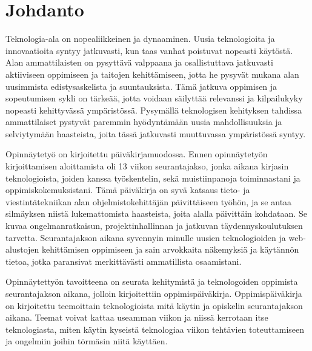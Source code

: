 \documentclass[11pt,a4paper,titlepage,oneside]{article}
\begin{document}
    






\section{Johdanto}              %




Teknologia-ala on nopealiikkeinen ja dynaaminen. 
Uusia teknologioita ja innovaatioita syntyy jatkuvasti, kun taas vanhat poistuvat nopeasti käytöstä.
Alan ammattilaisten on pysyttävä valppaana ja osallistuttava jatkuvasti aktiiviseen oppimiseen ja taitojen kehittämiseen,
jotta he pysyvät mukana alan uusimmista edistysaskelista ja suuntauksista.
Tämä jatkuva oppimisen ja sopeutumisen sykli on tärkeää,
jotta voidaan säilyttää relevanssi ja kilpailukyky nopeasti kehittyvässä ympäristössä.
%
Pysymällä teknologisen kehityksen tahdissa ammattilaiset pystyvät paremmin hyödyntämään uusia mahdollisuuksia ja selviytymään haasteista,
joita tässä jatkuvasti muuttuvassa ympäristössä syntyy.
\medskip




Opinnäytetyö on kirjoitettu päiväkirjamuodossa. 
Ennen opinnäytetyön kirjoittamisen aloittamista oli 13 viikon seurantajakso, jonka aikana kirjasin teknologioista,
joiden kanssa työskentelin, sekä muistiinpanoja toiminnastani ja oppimiskokemuksistani.
Tämä päiväkirja on syvä katsaus tieto- ja viestintätekniikan alan ohjelmistokehittäjän päivittäiseen työhön,
ja se antaa silmäyksen niistä lukemattomista haasteista, joita alalla päivittäin kohdataan.
Se kuvaa ongelmanratkaisun, projektinhallinnan ja jatkuvan täydennyskoulutuksen tarvetta.
Seurantajakson aikana syvennyin minulle uusien teknologioiden ja web-alustojen kehittämisen oppimiseen ja sain arvokkaita näkemyksiä ja käytännön tietoa,
jotka paransivat merkittävästi ammatillista osaamistani.
\medskip



% 
Opinnäytettyön tavoitteena on seurata kehitymistä ja teknologoiden oppimista seurantajakson aikana,
jolloin kirjoitettiin oppimispäiväkirja.
% 
Oppimispäiväkirja on kirjoitettu teemoittain teknologioista mitä käytin ja opiskelin seurantajakson aikana.
Teemat voivat kattaa useamman viikon ja niissä kerrotaan itse teknologiasta, miten käytin kyseistä teknologiaa viikon tehtävien toteuttamiseen ja
ongelmiin joihin törmäsin niitä käyttäen.
\medskip
\end{document}
